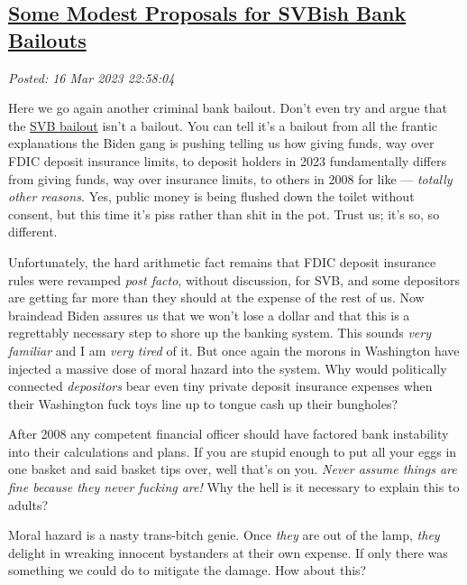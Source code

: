 %

\subsection*{\href{https://analyzethedatanotthedrivel.org/2023/03/16/some-modest-proposals-for-svbish-bank-bailouts/}{Some Modest Proposals for SVBish Bank Bailouts}}


\noindent\emph{Posted: 16 Mar 2023 22:58:04}
\vspace{6pt}

Here we go again another criminal bank bailout. Don't even try and argue
that the
\href{https://www.msn.com/en-us/money/companies/the-hideous-double-standards-of-the-silicon-valley-bank-bailout-bailouts-for-me-not-for-thee-opinion/ar-AA18IzEZ}{SVB
bailout} isn't a bailout. You can tell it's a bailout from all the
frantic explanations the Biden gang is pushing telling us how giving
funds, way over FDIC deposit insurance limits, to deposit holders in
2023 fundamentally differs from giving funds, way over insurance limits,
to others in 2008 for like --- \emph{totally other reasons.} Yes, public
money is being flushed down the toilet without consent, but this time
it's piss rather than shit in the pot. Trust us; it's so, so different.

Unfortunately, the hard arithmetic fact remains that FDIC deposit
insurance rules were revamped \emph{post facto}, without discussion, for
SVB, and some depositors are getting far more than they should at the
expense of the rest of us. Now braindead Biden assures us that we won't
lose a dollar and that this is a regrettably necessary step to shore up
the banking system. This sounds \emph{very familiar} and I am \emph{very tired}
of it. But once again the morons in Washington have injected a massive
dose of moral hazard into the system. Why would politically connected
\emph{depositors} bear even tiny private deposit insurance expenses when
their Washington fuck toys line up to tongue cash up their bungholes?

After 2008 any competent financial officer should have factored bank
instability into their calculations and plans. If you are stupid enough
to put all your eggs in one basket and said basket tips over, well
that's on you. \emph{Never assume things are fine because they never
fucking are!} Why the hell is it necessary to explain this to adults?

Moral hazard is a nasty trans-bitch genie. Once \emph{they} are out of
the lamp, \emph{they} delight in wreaking innocent bystanders at their
own expense. If only there was something we could do to mitigate the
damage. How about this?

